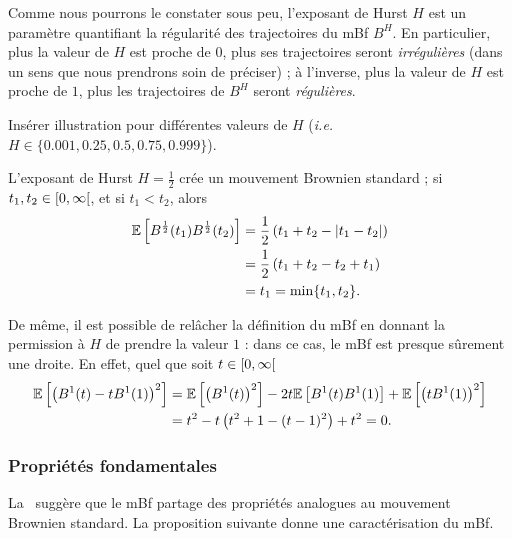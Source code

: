 Comme nous pourrons le constater sous peu, l'exposant de Hurst $H$ est
un paramètre quantifiant la régularité des trajectoires du mBf
$B^H$. En particulier, plus la valeur de $H$ est proche de $0$, plus
ses trajectoires seront \emph{\og{}irrégulières\fg{}} (dans un sens
que nous prendrons soin de préciser) ; à l'inverse, plus la valeur de
$H$ est proche de $1$, plus les trajectoires de $B^H$ seront
\emph{\og{}régulières\fg{}}.

\begin{alert}
  Insérer illustration pour différentes valeurs de $H$ (\emph{i.e.}
  $H\in\{0.001,0.25,0.5,0.75,0.999\}$).
\end{alert}

\begin{remarque}
  \label{rk:fBm-basic}
  L'exposant de Hurst $H=\frac{1}{2}$ crée un mouvement Brownien
  standard ; si $t_1,t_2\in\left[0,\infty\right[$, et si $t_1<t_2$, alors
  \begin{align*}
    \mathbb{E}\left[B^{\frac{1}{2}}(t_1)B^{\frac{1}{2}}(t_2)\right] &= \frac{1}{2}\left(t_1+t_2-|t_1-t_2|\right)\\
                                                   &=\frac{1}{2}\left(t_1+t_2-t_2+t_1\right)\\ &= t_1 = \min\{t_1,t_2\}.
  \end{align*}

  De même, il est possible de relâcher la définition du mBf en donnant
  la permission à $H$ de prendre la valeur $1$ : dans ce cas, le mBf
  est presque sûrement une droite. En effet, quel que soit
  $t\in\left[0,\infty\right[$
  \begin{align*}
    \mathbb{E}\left[\left(B^1(t)-tB^1(1)\right)^2\right] &= \mathbb{E}\left[\left(B^1(t)\right)^2\right]-2t\mathbb{E}\left[B^1(t)B^1(1)\right]+\mathbb{E}\left[\left(tB^1(1)\right)^2\right]\\
                                        &= t^2 -t\left(t^2+1-(t-1)^2\right) + t^2=0.
  \end{align*}
\end{remarque}

\subsubsection{Propriétés fondamentales}
\label{subsubsec:fBm-prop}

La~ suggère que le mBf partage des propriétés
analogues au mouvement Brownien standard. La proposition suivante
donne une caractérisation du mBf.

